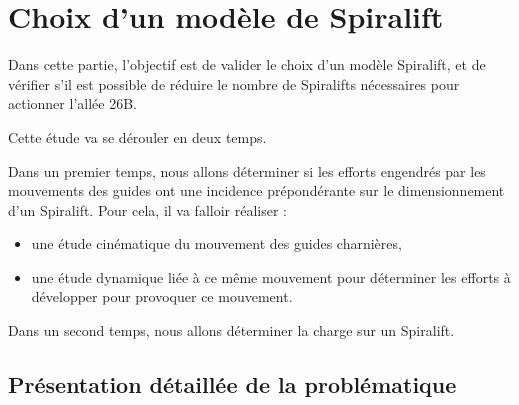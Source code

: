 





\section{Choix d'un modèle de Spiralift}

Dans cette partie, l'objectif est de valider le choix d'un modèle Spiralift, et de vérifier s'il est possible de réduire le nombre de Spiralifts nécessaires pour actionner l'allée 26B.

Cette étude va se dérouler en deux temps.

Dans un premier temps, nous allons déterminer si les efforts engendrés par les mouvements des guides ont une incidence prépondérante sur le dimensionnement d'un Spiralift. Pour cela, il va falloir réaliser :
\begin{itemize}
 \item une étude cinématique du mouvement des guides charnières,
 \item une étude dynamique liée à ce même mouvement pour déterminer les efforts à développer pour provoquer ce mouvement.
\end{itemize}

Dans un second temps, nous allons déterminer la charge sur un Spiralift.

\subsection{Présentation détaillée de la problématique}

